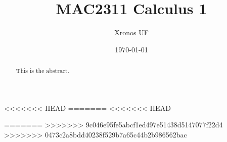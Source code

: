 \documentclass{xourse}
\title{MAC2311 Calculus 1}
\author{Xronos UF}
\date{\today}
\begin{document}
\begin{abstract}
	This is the abstract.
\end{abstract}

\maketitle

\tableofcontents
{}
<<<<<<< HEAD
=======
<<<<<<< HEAD


=======
>>>>>>> 9c046e95fe5abcf1ed497e51438d5147077f22d4
>>>>>>> 0473c2a8bdd40238f529b7a65c44b2b986562bac
\end{document}

